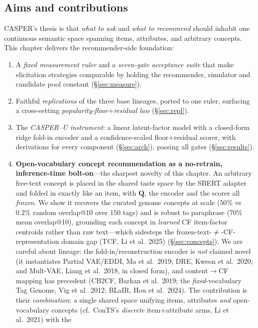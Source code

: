 \documentclass[11pt]{article}
\newcommand{\Q}{\mathbf{Q}}
\begin{document}
\subsection{Aims and contributions}
CASPER's thesis is that \emph{what to ask} and \emph{what to recommend} should inhabit one continuous semantic
space spanning items, attributes, and arbitrary concepts. This chapter delivers the recommender-side foundation:
\begin{enumerate}[leftmargin=1.4em,itemsep=1pt]
  \item A \emph{fixed measurement ruler} and a \emph{seven-gate acceptance suite} that make elicitation strategies
        comparable by holding the recommender, simulator and candidate pool constant (\S\ref{sec:measure}).
  \item Faithful \emph{replications} of the three base lineages, ported to one ruler, surfacing a cross-setting
        \emph{popularity-floor$+$residual law} (\S\ref{sec:repl}).
  \item The \emph{CASPER--U instrument}: a linear latent-factor model with a closed-form ridge fold-in encoder
        and a confidence-scaled floor$+$residual scorer, with derivations for every component
        (\S\ref{sec:arch}), passing all gates (\S\ref{sec:results}).
  \item \textbf{Open-vocabulary concept recommendation as a no-retrain, inference-time bolt-on}---the sharpest
        novelty of this chapter. An arbitrary free-text concept is placed in the shared taste space by the SBERT
        adapter and folded in exactly like an item, with $\Q$, the encoder and the scorer all \emph{frozen}. We
        show it recovers the curated genome concepts at scale ($50\%$ vs $0.2\%$ random overlap@10 over $150$ tags)
        and is robust to paraphrase ($70\%$ mean overlap@10), grounding each concept in \emph{learned} CF item-factor
        centroids rather than raw text---which sidesteps the frozen-text-$\neq$-CF-representation domain gap (TCF,
        Li et al.\ 2025) (\S\ref{sec:concepts}). We are careful about lineage: the fold-in/reconstruction encoder is
        \emph{not} claimed novel (it instantiates Partial VAE/EDDI, Ma et al.\ 2019; DRE, Kweon et al.\ 2020; and
        Mult-VAE, Liang et al.\ 2018, in closed form), and content$\to$CF mapping has precedent (CB2CF, Barkan et
        al.\ 2019; the \emph{fixed}-vocabulary Tag Genome, Vig et al.\ 2012; BLaIR, Hou et al.\ 2024). The
        contribution is their \emph{combination}: a single shared space unifying items, attributes \emph{and}
        open-vocabulary concepts (cf.\ ConTS's \emph{discrete} item$+$attribute arms, Li et al.\ 2021) with the

\end{enumerate}
\end{document}
